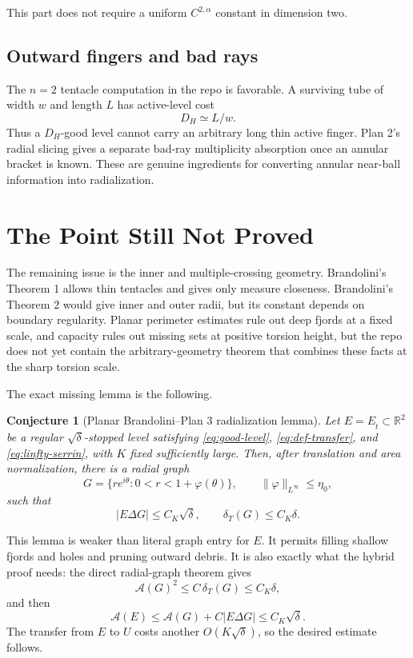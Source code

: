 \documentclass[11pt]{article}
\newtheorem{conjecture}[theorem]{Conjecture}
\newcommand{\R}{\mathbb R}
\newcommand{\dT}{\delta_T}
\newcommand{\A}{\mathcal A}
\newcommand{\Et}{E_{\hat t}}
\begin{document}
This part does not require a uniform \(C^{2,\alpha}\) constant in dimension
two.

\subsection{Outward fingers and bad rays}

The \(n=2\) tentacle computation in the repo is favorable.  A surviving tube
of width \(w\) and length \(L\) has active-level cost
\[
   D_H\simeq L/w.
\]
Thus a \(D_H\)-good level cannot carry an arbitrary long thin active finger.
Plan 2's radial slicing gives a separate bad-ray multiplicity absorption once
an annular bracket is known.  These are genuine ingredients for converting
annular near-ball information into radialization.

\section{The Point Still Not Proved}

The remaining issue is the inner and multiple-crossing geometry.  Brandolini's
Theorem 1 allows thin tentacles and gives only measure closeness.  Brandolini's
Theorem 2 would give inner and outer radii, but its constant depends on
boundary regularity.  Planar perimeter estimates rule out deep fjords at a
fixed scale, and capacity rules out missing sets at positive torsion height,
but the repo does not yet contain the arbitrary-geometry theorem that combines
these facts at the sharp torsion scale.

The exact missing lemma is the following.

\begin{conjecture}[Planar Brandolini--Plan 3 radialization lemma]
\label{conj:entry}
Let \(E=\Et\subset\R^2\) be a regular \(\sqrt\delta\)-stopped level satisfying
\eqref{eq:good-level}, \eqref{eq:def-transfer}, and
\eqref{eq:linfty-serrin}, with \(K\) fixed sufficiently large.  Then, after
translation and area normalization, there is a radial graph
\[
   G=\{re^{i\theta}:0<r<1+\varphi(\theta)\},
   \qquad
   \|\varphi\|_{L^\infty}\le \eta_0,
\]
such that
\[
   |E\Delta G|\le C_K\sqrt\delta,
   \qquad
   \dT(G)\le C_K\delta .
   \tag{5.1}\label{eq:radialization}
\]
\end{conjecture}

This lemma is weaker than literal graph entry for \(E\).  It permits filling
shallow fjords and holes and pruning outward debris.  It is also exactly what
the hybrid proof needs: the direct radial-graph theorem gives
\[
   \A(G)^2\le C\,\dT(G)\le C_K\delta,
\]
and then
\[
   \A(E)\le \A(G)+C|E\Delta G|\le C_K\sqrt\delta.
\]
The transfer from \(E\) to \(U\) costs another \(O(K\sqrt\delta)\), so the
desired estimate follows.
\end{document}
